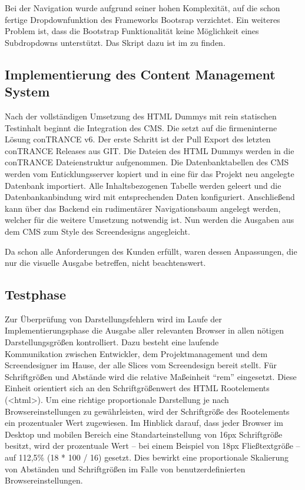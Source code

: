 Bei der Navigation wurde aufgrund seiner hohen Komplexität, auf die schon
fertige Dropdownfunktion des Frameworks Bootsrap verzichtet. Ein weiteres
Problem ist, dass die Bootstrap Funktionalität keine Möglichkeit eines
Subdropdowns unterstützt. Das Skript dazu ist im  zu
finden.

\subsection{Implementierung des Content Management System}
\label{sec:ImplementierungCMS}

Nach der vollständigen Umsetzung des \ac{HTML} Dummys mit rein statischen
Testinhalt beginnt die Integration des \ac{CMS}. Die \mh setzt auf die
firmeninterne Lösung conTRANCE v6. Der erste Schritt ist der Pull \bzw Export
des letzten conTRANCE Releases aus GIT. Die Dateien des HTML Dummys werden
in die conTRANCE Dateienstruktur aufgenommen. Die Datenbanktabellen des
\ac{CMS} werden vom Enticklungsserver kopiert und in eine für das Projekt neu
angelegte Datenbank importiert. Alle Inhaltsbezogenen Tabelle werden geleert
und die Datenbankanbindung wird mit entsprechenden Daten konfiguriert.
Anschließend kann über das Backend ein rudimentärer Navigationsbaum angelegt
werden, welcher für die weitere Umsetzung notwendig ist. Nun werden die Ausgaben
aus dem \ac{CMS} zum Style des Screendesigns angegleicht.

Da \ct schon alle Anforderungen des Kunden erfüllt, waren dessen Anpassungen,
die nur die visuelle Ausgabe betreffen, nicht beachtenswert.

\subsection{Testphase}
\label{sec:Testphase}
Zur Überprüfung von Darstellungsfehlern wird im Laufe der
Implementierungsphase die Ausgabe aller relevanten Browser in allen nötigen
Darstellungsgrößen kontrolliert. Dazu besteht eine laufende \\ Kommunikation
zwischen Entwickler, dem Projektmanagement und dem Screendesigner im Hause, der
alle Slices vom Screendesign bereit stellt.
Für Schriftgrößen und Abstände wird die relative Maßeinheit "`rem"' eingesetzt.
Diese Einheit orientiert sich an den Schriftgrößenwert des HTML
Rootelements (<html>). Um eine richtige proportionale Darstellung je nach
Browsereinstellungen zu gewährleisten, wird der Schriftgröße des Rootelements
ein prozentualer Wert zugewiesen. Im Hinblick darauf, dass jeder Browser im
Desktop und mobilen Bereich eine Standarteinstellung von 16px Schriftgröße
besitzt, wird der prozentuale Wert -- bei einem Beispiel von 18px
Fließtextgröße -- auf 112,5\% (18 * 100 / 16) gesetzt. Dies bewirkt eine
proportionale Skalierung von Abständen und Schriftgrößen im Falle von
benutzerdefinierten Browsereinstellungen.

